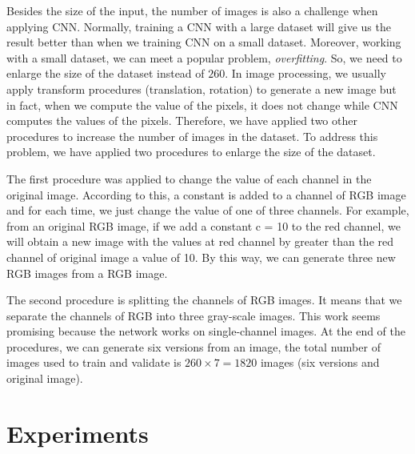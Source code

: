 \documentclass[10pt]{article}
\begin{document}
Besides the size of the input, the number of images is also a challenge when applying CNN. Normally, training a CNN with a large dataset will give us the result better than when we training CNN on a small dataset. Moreover, working with a small dataset, we can meet a popular problem, \textit{overfitting}. So, we need to enlarge the size of the dataset instead of $260$. In image processing, we usually apply transform procedures (translation, rotation) to generate a new image but in fact, when we compute the value of the pixels, it does not change while CNN computes the values of the pixels. Therefore, we have applied two other procedures to increase the number of images in the dataset. To address this problem, we have applied two procedures to enlarge the size of the dataset.

The first procedure was applied to change the value of each
channel in the original image. According to this, a constant is
added to a channel of RGB image and for each time, we just
change the value of one of three channels. For example, from
an original RGB image, if we add a constant c = 10 to the
red channel, we will obtain a new image with the values at
red channel by greater than the red channel of original image
a value of 10. By this way, we can generate three new RGB
images from a RGB image.

The second procedure is splitting the channels of RGB
images. It means that we separate the channels of RGB into
three gray-scale images. This work seems promising because
the network works on single-channel images. At the end of the procedures, we
can generate six versions from an image, the total number of
images used to train and validate is $260 \times 7 = 1820$ images
(six versions and original image).

\section{Experiments}
\end{document}
